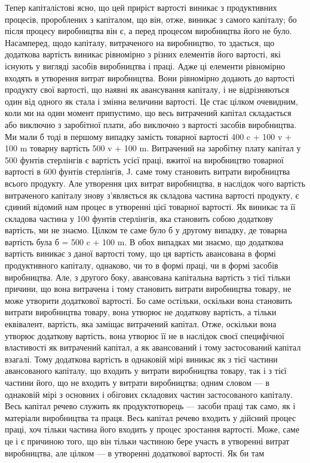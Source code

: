 
Тепер капіталістові ясно, що цей приріст вартості виникає
з продуктивних процесів, пророблених з капіталом, що він,
отже, виникає з самого капіталу; бо після процесу виробництва
він є, а перед процесом виробництва його не було. Насамперед,
щодо капіталу, витраченого на виробництво, то здається,
що додаткова вартість виникає рівномірно з різних елементів
його вартості, які існують у вигляді засобів виробництва і праці.
Адже ці елементи рівномірно входять в утворення витрат виробництва.
Вони рівномірно додають до вартості продукту свої
вартості, що наявні як авансування капіталу, і не відрізняються
один від одного як стала і змінна величини вартості. Це стає
цілком очевидним, коли ми на один момент припустимо, що
весь витрачений капітал складається або виключно з заробітної
плати, або виключно з вартості засобів виробництва. Ми мали б
тоді в першому випадку замість товарної вартості 400 c + 100 v +
100 m товарну вартість 500 v + 100 m. Витрачений на заробітну
плату капітал у 500 фунтів стерлінгів є вартість усієї праці,
вжитої на виробництво товарної вартості в 600 фунтів стерлінгів,
J. саме тому становить витрати виробництва всього продукту. Але
утворення цих витрат виробництва, в наслідок чого вартість витраченого
капіталу знову з’являється як складова частина вартості
продукту, є єдиний відомий нам процес в утворенні цієї товарної
вартості. Як виникає та її складова частина у 100 фунтів стерлінгів,
яка становить собою додаткову вартість, ми не знаємо.
Цілком те саме було б у другому випадку, де товарна вартість
була б = 500 c + 100 m. В обох випадках ми знаємо, що додаткова
вартість виникає з даної вартості тому, що ця вартість авансована
в формі продуктивного капіталу, однаково, чи то в формі праці,
чи в формі засобів виробництва. Але, з другого боку, авансована
капітальна вартість з тієї тільки причини, що вона витрачена
і тому становить витрати виробництва товару, не може
утворити додаткової вартості. Бо саме остільки, оскільки вона
становить витрати виробництва товару, вона утворює не додаткову
вартість, а тільки еквівалент, вартість, яка заміщає витрачений
капітал. Отже, оскільки вона утворює додаткову вартість,
вона утворює її не в наслідок своєї специфічної властивості як
витрачений капітал, а як авансований і тому застосований капітал
взагалі. Тому додаткова вартість в однаковій мірі виникає як
з тієї частини авансованого капіталу, що входить у витрати
виробництва товару, так і з тієї частини його, що не входить
у витрати виробництва; одним словом — в однаковій мірі з основних
і обігових складових частин застосованого капіталу. Весь
капітал речево служить як продуктотворець — засоби праці так
само, як і матеріали виробництва та праця. Весь капітал речево
входить у дійсний процес праці, хоч тільки частина його входить
у процес зростання вартості. Може, саме це і є причиною
того, що він тільки частиною бере участь в утворенні витрат виробництва,
але цілком — в утворенні додаткової вартості. Як би там
\parbreak{}  %
